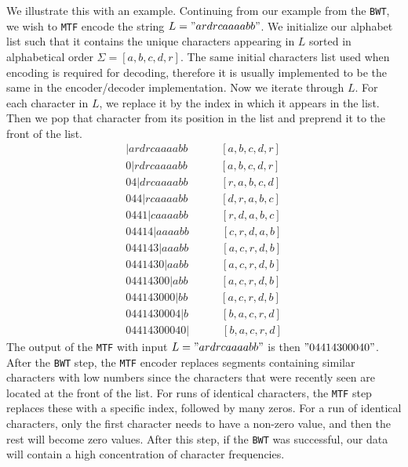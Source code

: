 \documentclass{article}
\begin{document}
We illustrate this with an example. Continuing from our example from the \texttt{BWT}, we wish to \texttt{MTF} encode the string \(L = "ardrcaaaabb"\). We initialize our alphabet list such that it contains the unique characters appearing in \(L\) sorted in alphabetical order \(\Sigma=[a, b, c, d, r]\).
The same initial characters list used when encoding is required for decoding, therefore it is usually implemented to be the same in the encoder/decoder implementation. 
Now we iterate through \(L\). For each character in \(L\), we replace it by the index in which it appears in the list. Then we pop that character from its position in the list and preprend it to the front of the list.
{
    \begin{align*}
        |ardrcaaaabb \quad \quad\quad [a, b, c, d, r] \\[-4pt]
        0|rdrcaaaabb \quad \quad\quad [a, b, c, d, r] \\[-4pt]
        04|drcaaaabb \quad \quad\quad [r, a, b, c, d] \\[-4pt]
        044|rcaaaabb \quad \quad\quad [d, r, a, b, c] \\[-4pt]
        0441|caaaabb \quad \quad\quad [r, d, a, b, c] \\[-4pt]
        04414|aaaabb \quad \quad\quad [c, r, d, a, b] \\[-4pt]
        044143|aaabb \quad \quad\quad [a, c, r, d, b] \\[-4pt]
        0441430|aabb \quad \quad\quad [a, c, r, d, b] \\[-4pt]
        04414300|abb \quad \quad\quad [a, c, r, d, b] \\[-4pt]
        044143000|bb \quad \quad\quad [a, c, r, d, b] \\[-4pt]
        0441430004|b \quad \quad\quad [b, a, c, r, d] \\[-4pt]
        04414300040| \quad \quad\quad [b, a, c, r, d]
    \end{align*}
}
The output of the \texttt{MTF} with input \(L = "ardrcaaaabb"\) is then \("04414300040"\). After the \texttt{BWT} step, the \texttt{MTF} encoder replaces segments containing similar characters with low numbers since the characters that were recently seen are located at the front of the list. 
For runs of identical characters, the \texttt{MTF} step replaces these with a specific index, followed by many zeros. For a run of identical characters, only the first character needs to have a non-zero value, and then the rest will become zero values.
After this step, if the \texttt{BWT} was successful, our data will contain a high concentration of character frequencies.
\end{document}
